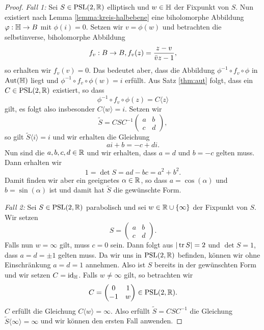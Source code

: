 \begin{proof}
  \emph{Fall 1:} Sei $S \in \operatorname{PSL}(2, \mathbb{R})$ elliptisch und $w \in \mathbb{H}$ der
  Fixpunkt von $S$. Nun existiert nach Lemma \ref{lemma:kreis-halbebene}
  eine biholomorphe Abbildung $\varphi: \mathbb{H} \rightarrow B$ mit $\phi(i) = 0$. Setzen
  wir $v = \phi(w)$ und betrachten die selbstinverse, biholomorphe
  Abbildung
  \[
  f_v : B \rightarrow B, f_v(z) = \frac{z-v}{\bar v z - 1},
  \]
  so erhalten wir $f_v(v) = 0$. Das bedeutet aber, dass die Abbildung
  $\phi^{-1} \circ f_v \circ \phi$ in $\operatorname{Aut}(\mathbb{H})$ liegt und $\phi^{-1}
  \circ f_v \circ \phi (w) = i$ erfüllt. Aus Satz \ref{thm:aut} folgt,
  dass ein $C \in \operatorname{PSL}(2, \mathbb{R})$ existiert, so dass
  \[
  \phi^{-1} \circ f_v \circ \phi(z) = C \langle z \rangle
  \]
  gilt, es folgt also insbesonder $C\langle w \rangle = i$. Setzen wir
  \[
  \tilde S = CSC^{-1}
  \begin{pmatrix}
    a & b\\
    c & d
  \end{pmatrix},
  \]
  so gilt $\tilde S\langle i \rangle = i$ und wir erhalten die
  Gleichung
  \[
  ai +b = -c + di.
  \]
  Nun sind die $a,b,c,d \in \mathbb{R}$ und wir erhalten, dass $a = d$ und $b
  = - c$ gelten muss. Dann erhalten wir
  \[
  1 = \det S = ad - bc = a^2 + b^2.
  \]
  Damit finden wir aber ein geeignetes $\alpha \in \mathbb{R}$, so dass
  $a = \cos(\alpha)$ und $b = \sin(\alpha)$ ist und damit hat $\tilde
  S$ die gewünschte Form.

  \emph{Fall 2:} Sei $S \in \operatorname{PSL}(2, \mathbb{R})$ parabolisch und sei $w \in \mathbb{R}
  \cup \{\infty\}$ der Fixpunkt von $S$. Wir setzen
  \[
  S =
  \begin{pmatrix}
    a & b\\
    c & d
  \end{pmatrix}.
  \]
  Falls nun $w = \infty$ gilt, muss $c =0$ sein. Dann folgt aus
  $|\operatorname{tr} S| = 2$ und $\det S = 1$, dass $a = d = \pm 1$ gelten
  muss. Da wir uns in $\operatorname{PSL}(2,\mathbb{R})$ befinden, können wir ohne
  Einschränkung $a = d = 1$ annehmen. Also ist $S$ bereits in der
  gewünschten Form und wir setzen $C = \operatorname{id}_{\mathbb{H}}$. Falls $w \neq \infty$ gilt, so betrachten wir
  \[
  C =
  \begin{pmatrix}
    0 & 1 \\
    -1 & w
  \end{pmatrix}
  \in \operatorname{PSL}(2,\mathbb{R}).
  \]
  $C$ erfüllt die Gleichung $C \langle w \rangle  = \infty$. Also
  erfüllt $\tilde S = C S C^{-1}$ die Gleichung $\tilde S\langle \infty
  \rangle = \infty$ und wir können den ersten Fall anwenden.
  

\end{proof}
